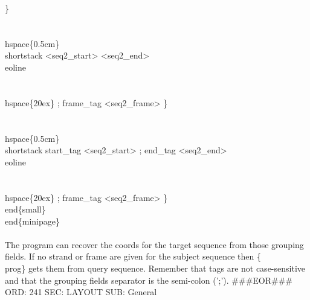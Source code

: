 \documentclass[11pt]{article}
\begin{document}
  \}
 \\\\%
 \\hspace\{0.5cm\}\\shortstack%
   <seq2_start> <seq2_end> 
   \\eoline\\\\\\hspace\{20ex\} %
      ; frame_tag <seq2_frame> %
  \}
 \\\\%
 \\hspace\{0.5cm\}\\shortstack%
   start_tag <seq2_start> ; end_tag <seq2_end>
   \\eoline\\\\\\hspace\{20ex\} %
      ; frame_tag <seq2_frame> %
  \}
\\end\{small\}
\\end\{minipage\}\\\\%
The program can recover the coords for the target sequence from those grouping 
fields. If no strand or frame are given for the subject sequence then \{\\prog\}
gets them from query sequence. Remember that tags are not case-sensitive and 
that the grouping fields separator is the semi-colon (';'). 
###EOR###
ORD: 241
SEC: LAYOUT
SUB: General
\end{document}
